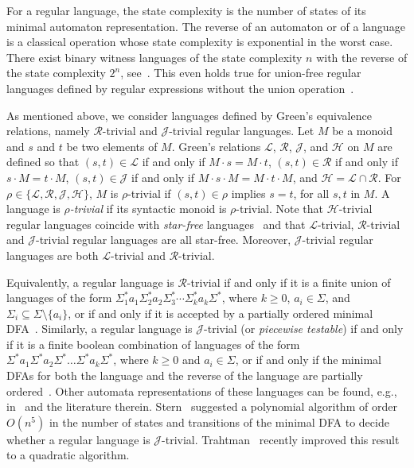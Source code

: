 \documentclass[runningheads]{llncs}
\newcommand{\R}{$\mathcal{R}$}
\newcommand{\J}{$\mathcal{J}$}
\begin{document}
  For a regular language, the state complexity is the number of states of its minimal automaton representation. The reverse of an automaton or of a language is a classical operation whose state complexity is exponential in the worst case. There exist binary witness languages of the state complexity $n$ with the reverse of the state complexity $2^{n}$, see~\cite{le81,yzs94}. This even holds true for union-free regular languages defined by regular expressions without the union operation~\cite{ijfcsJiraskovaM11}.

  As mentioned above, we consider languages defined by Green's equivalence relations, namely \R-trivial and \J-trivial regular languages. Let $M$ be a monoid and $s$ and $t$ be two elements of $M$. Green's relations $\mathcal{L}$, \R, \J, and $\mathcal{H}$ on $M$ are defined so that
    $(s,t)\in\mathcal{L}$ if and only if $M\cdot s = M\cdot t$,
    $(s,t)\in\mathcal{R}$ if and only if $s\cdot M = t\cdot M$,
    $(s,t)\in\mathcal{J}$ if and only if $M\cdot s\cdot M = M\cdot t\cdot M$, and
    $\mathcal{H}=\mathcal{L}\cap\mathcal{R}$.
  For $\rho\in\{\mathcal{L},\mathcal{R},\mathcal{J},\mathcal{H}\}$, $M$ is $\rho$\mbox{-}trivial if $(s,t)\in\rho$ implies $s = t$, for all $s,t$ in $M$. A language is {\em $\rho$\mbox{-}trivial} if its syntactic monoid is $\rho$-trivial. Note that $\mathcal{H}$-trivial regular languages coincide with {\em star-free} languages~\cite[Chapter~11]{lawson2003finite} and that $\mathcal{L}$-trivial, \R-trivial and \J-trivial regular languages are all star-free. Moreover, \J-trivial regular languages are both $\mathcal{L}$-trivial and \R-trivial.

  Equivalently, a regular language is \R-trivial if and only if it is a finite union of languages of the form $\Sigma_1^* a_1 \Sigma_2^* a_2 \Sigma_3^* \cdots \Sigma_k^* a_k \Sigma^*$, where $k\ge 0$, $a_i\in \Sigma$, and $\Sigma_i\subseteq \Sigma \setminus \{a_i\}$, or if and only if it is accepted by a partially ordered minimal DFA~\cite{BrzozowskiF80}. Similarly, a regular language is \J-trivial (or {\em piecewise testable}) if and only if it is a finite boolean combination of languages of the form $\Sigma^*a_1\Sigma^*a_2\Sigma^*\ldots \Sigma^*a_k\Sigma^*$, where $k\ge 0$ and $a_i\in \Sigma$, or if and only if the minimal DFAs for both the language and the reverse of the language are partially ordered~\cite{Simon1972,Simon1975}. Other automata representations of these languages can be found, e.g., in~\cite{LauserCIAA} and the literature therein. Stern~\cite{Stern85a} suggested a polynomial algorithm 
  of order $O(n^5)$ in the number of states and transitions of the minimal DFA 
  to decide whether a regular language is \J-trivial. Trahtman~\cite{Trahtman2001} recently improved this result to a quadratic algorithm. 
  
\end{document}
